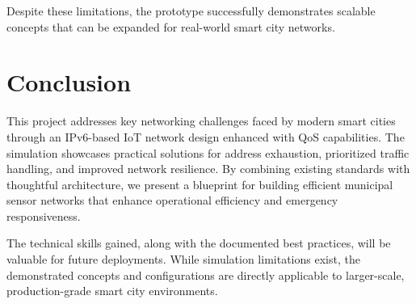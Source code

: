 \documentclass[12pt,a4paper]{article}
\begin{document}
Despite these limitations, the prototype successfully demonstrates scalable concepts that can be expanded for real-world smart city networks.

\section*{Conclusion}
{}
This project addresses key networking challenges faced by modern smart cities through an IPv6-based IoT network design enhanced with QoS capabilities. The simulation showcases practical solutions for address exhaustion, prioritized traffic handling, and improved network resilience. By combining existing standards with thoughtful architecture, we present a blueprint for building efficient municipal sensor networks that enhance operational efficiency and emergency responsiveness.

The technical skills gained, along with the documented best practices, will be valuable for future deployments. While simulation limitations exist, the demonstrated concepts and configurations are directly applicable to larger-scale, production-grade smart city environments.
\end{document}
